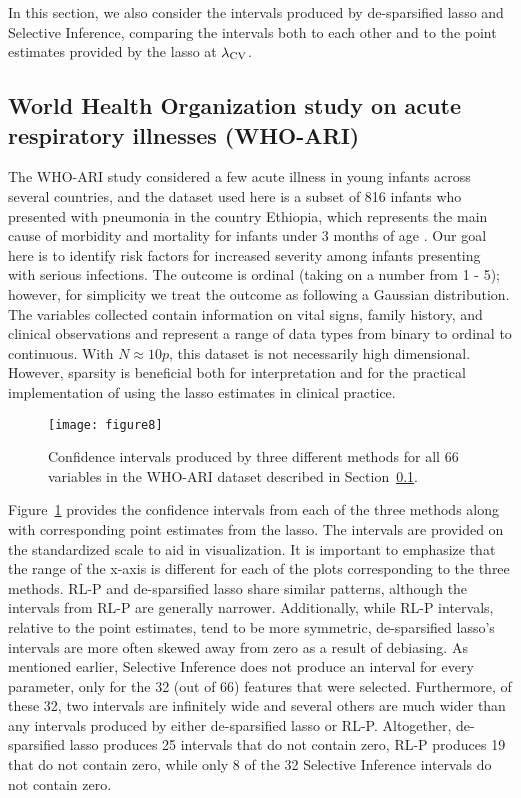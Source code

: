 In this section, we also consider the intervals produced by de-sparsified lasso and Selective Inference, comparing the intervals both to each other and to the point estimates provided by the lasso at $\lambda_{\textrm{CV}}$.

\subsection{World Health Organization study on acute respiratory illnesses (WHO-ARI)}\label{Sec:WHO-ARI}

The WHO-ARI study considered a few acute illness in young infants across several countries, and the dataset used here is a subset of 816 infants who presented with pneumonia in the country Ethiopia, which represents the main cause of morbidity and mortality for infants under 3 months of age \citep{Harrell1998}. Our goal here is to identify risk factors for increased severity among infants presenting with serious infections. The outcome is ordinal (taking on a number from 1 - 5); however, for simplicity we treat the outcome as following a Gaussian distribution. The variables collected contain information on vital signs, family history, and clinical observations and represent a range of data types from binary to ordinal to continuous. With $N \approx 10p$, this dataset is not necessarily high dimensional. However, sparsity is beneficial both for interpretation and for the practical implementation of using the lasso estimates in clinical practice.

\begin{figure}[htb!]
  \begin{center}
    \texttt{[image: figure8]}
    \caption{\label{Fig:comparison_data_whoari} Confidence intervals produced by three different methods for all 66 variables in the WHO-ARI dataset described in Section~\ref{Sec:WHO-ARI}.}
  \end{center}
\end{figure}

Figure~\ref{Fig:comparison_data_whoari} provides the confidence intervals from each of the three methods along with corresponding point estimates from the lasso. The intervals are provided on the standardized scale to aid in visualization. It is important to emphasize that the range of the x-axis is different for each of the plots corresponding to the three methods. RL-P and de-sparsified lasso share similar patterns, although the intervals from RL-P are generally narrower. Additionally, while RL-P intervals, relative to the point estimates, tend to be more symmetric, de-sparsified lasso's intervals are more often skewed away from zero as a result of debiasing. As mentioned earlier, Selective Inference does not produce an interval for every parameter, only for the 32 (out of 66) features that were selected. Furthermore, of these 32, two intervals are infinitely wide and several others are much wider than any intervals produced by either de-sparsified lasso or RL-P. Altogether, de-sparsified lasso produces 25 intervals that do not contain zero, RL-P produces 19 that do not contain zero, while only 8 of the 32 Selective Inference intervals do not contain zero.

